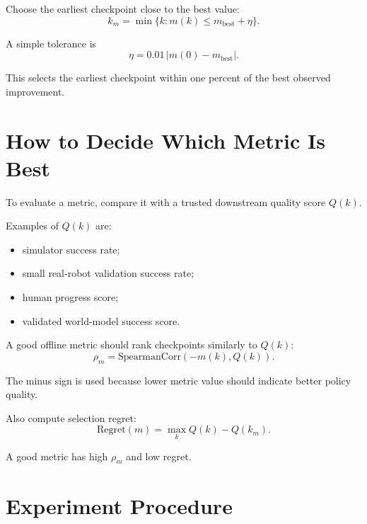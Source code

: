 \documentclass[11pt]{article}
\begin{document}
Choose the earliest checkpoint close to the best value:
\begin{equation}
k_m=\min\{k:m(k)\le m_{\mathrm{best}}+\eta\}.
\end{equation}

A simple tolerance is
\begin{equation}
\eta=0.01\,|m(0)-m_{\mathrm{best}}|.
\end{equation}

This selects the earliest checkpoint within one percent of the best observed improvement.

\section{How to Decide Which Metric Is Best}

To evaluate a metric, compare it with a trusted downstream quality score $Q(k)$.

Examples of $Q(k)$ are:
\begin{itemize}
    \item simulator success rate;
    \item small real-robot validation success rate;
    \item human progress score;
    \item validated world-model success score.
\end{itemize}

A good offline metric should rank checkpoints similarly to $Q(k)$:
\begin{equation}
\rho_m=\mathrm{SpearmanCorr}(-m(k),Q(k)).
\end{equation}

The minus sign is used because lower metric value should indicate better policy quality.

Also compute selection regret:
\begin{equation}
\mathrm{Regret}(m)=\max_k Q(k)-Q(k_m).
\end{equation}

A good metric has high $\rho_m$ and low regret.

\section{Experiment Procedure}
\end{document}
